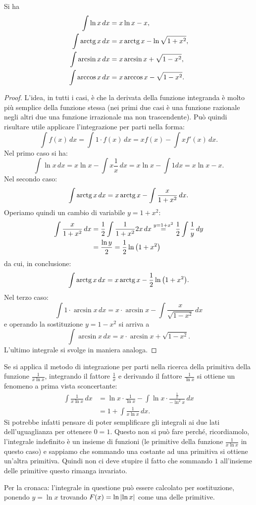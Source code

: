 \begin{theorem}
\mymark{***}
Si ha
\begin{align*}
  \int \ln x\, dx  &= x \ln x - x, \\
  \int \operatorname{arctg} x\, dx &= x \operatorname{arctg} x - \ln \sqrt{1+x^2},\\
  \int \arcsin x\, dx &= x \arcsin x + \sqrt{1-x^2},\\
  \int \arccos x\, dx &= x \arccos x - \sqrt{1-x^2}.
\end{align*}
\end{theorem}
%
\begin{proof}
\mymark{***}
L'idea, in tutti i casi, è che la derivata della funzione integranda
è molto più semplice della funzione stessa (nei primi due casi è una funzione 
razionale negli altri due una funzione irrazionale ma non trascendente).
Può quindi risultare utile applicare l'integrazione
per parti nella forma:
\[
  \int f(x)\, dx = \int 1\cdot f(x)\, dx = x f(x) - \int x f'(x)\, dx.
\]
Nel primo caso si ha:
\[
\int \ln x\, dx = x \ln x - \int x \frac{1}{x}\, dx
 = x \ln x - \int 1 dx = x \ln x - x.
\]
Nel secondo caso:
\[
\int \operatorname{arctg} x\, dx = x \operatorname{arctg} x - \int \frac{x}{1+x^2}\, dx.
\]
Operiamo quindi un cambio di variabile $y=1+x^2$:
\begin{align*}
\int \frac{x}{1+x^2}\, dx
&= \frac{1}{2}\int \frac{1}{1+x^2} 2x \, dx
\stackrel{y=1+x^2} = \frac{1}{2}\int \frac 1 y\, dy \\
&= \frac{\ln y}{2} = \frac{1}{2}\ln{\left( 1+x^2 \right)}
\end{align*}
da cui, in conclusione:
\[
 \int \operatorname{arctg} x\, dx = x \operatorname{arctg} x - \frac 1 2 \ln{\left( 1+x^2 \right)}.
\]
Nel terzo caso:
\[
 \int 1\cdot \arcsin x\, dx = x\cdot \arcsin x - \int\frac{x}{\sqrt{1-x^2}}\, dx  
\]
e operando la sostituzione $y=1-x^2$ si arriva a 
\[
  \int \arcsin x\, dx = x \cdot \arcsin x + \sqrt{1-x^2}.  
\]
L'ultimo integrale si svolge in maniera analoga.
\end{proof}

\begin{remark}
Se si applica il metodo di integrazione per parti nella ricerca della primitiva
della funzione $\frac{1}{x\ln x}$, integrando il fattore $\frac 1 x$ e
derivando il fattore $\frac 1 {\ln x}$ si ottiene un fenomeno a prima vista
sconcertante:
\begin{align*}
  \int \frac{1}{x\ln x}\,dx
  &= \ln x \cdot \frac{1}{\ln x} - \int \ln x \cdot \frac{\frac 1 x}{-\ln^2 x}\, dx\\
  &= 1 + \int \frac{1}{x\ln x}\, dx.
\end{align*}
Si potrebbe infatti pensare di poter semplificare gli integrali ai due lati
dell'uguaglianza per ottenere $0=1$.
Questo non si può fare perché, ricordiamolo, l'integrale indefinito è un insieme
di funzioni (le primitive della funzione $\frac{1}{x\ln x}$ in questo caso)
e sappiamo che sommando una costante ad una primitiva si ottiene un'altra primitiva.
Quindi non ci deve stupire il fatto che sommando $1$ all'insieme delle primitive
questo rimanga invariato.

Per la cronaca: l'integrale in questione può essere calcolato per sostituzione,
ponendo $y=\ln x$ trovando $F(x) = \ln{\left|\ln x\right|}$ come una delle primitive.
\end{remark}
%
%
%
